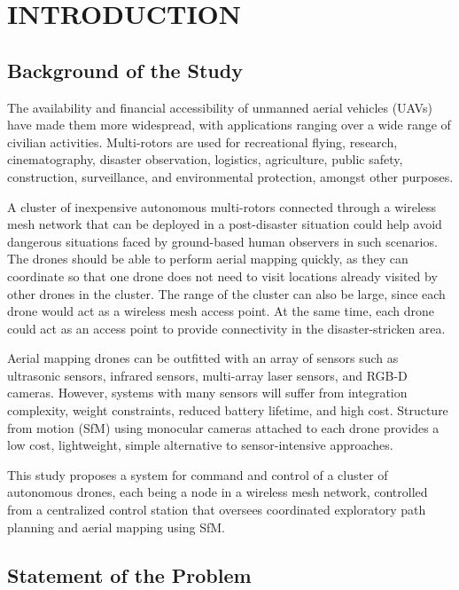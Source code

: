 \setlength{\parindent}{0pt} 
\setlength{\parskip}{0mm}
\setlength{\baselineskip}{1.6em}

\chapter{INTRODUCTION} 

\section{Background of the Study}

The availability and financial accessibility of unmanned aerial vehicles (UAVs) have made them more widespread, with applications ranging over a wide range of civilian activities. Multi-rotors are used for recreational flying, research, cinematography, disaster observation, logistics, agriculture,  public safety, construction, surveillance, and environmental protection, amongst other purposes. 

A cluster of inexpensive autonomous multi-rotors connected through a wireless mesh network that can be deployed in a post-disaster situation could help avoid dangerous situations faced by ground-based human observers in such scenarios. The drones should be able to perform aerial mapping quickly, as they can coordinate so that one drone does not need to visit locations already visited by other drones in the cluster. The range of the cluster can also be large, since each drone would act as a wireless mesh access point. At the same time, each drone could act as an access point to provide connectivity in the disaster-stricken area.  

Aerial mapping drones can be outfitted with an array of sensors such as ultrasonic sensors, infrared sensors, multi-array laser sensors, and RGB-D cameras. However, systems with many sensors will suffer from integration complexity, weight constraints, reduced battery lifetime, and high cost. Structure from motion (SfM) using monocular cameras attached to each drone provides a low cost, lightweight, simple alternative to sensor-intensive approaches. 

This study proposes a system for command and control of a cluster of autonomous drones, each being a node in a wireless mesh network, controlled from a centralized control station that oversees coordinated exploratory path planning and aerial mapping using SfM.

\section{Statement of the Problem}

